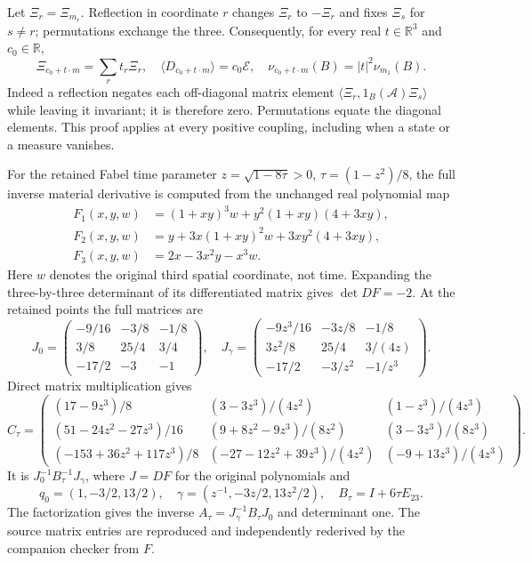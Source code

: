 Let $\Xi_r=\Xi_{m_r}$. Reflection in coordinate $r$ changes $\Xi_r$ to
$-\Xi_r$ and fixes $\Xi_s$ for $s\ne r$; permutations exchange the three.
Consequently, for every real $t\in\mathbb R^3$ and $c_0\in\mathbb R$,
\begin{equation}\label{eq:fabel-affine-raw}
 \Xi_{c_0+t\cdot m}=\sum_rt_r\Xi_r,\quad
 \langle D_{c_0+t\cdot m}\rangle=c_0\mathcal E,\quad
 \nu_{c_0+t\cdot m}(B)=|t|^2\nu_{m_1}(B).
\end{equation}
Indeed a reflection negates each off-diagonal matrix element
$\langle\Xi_r,1_B(\mathcal A)\Xi_s\rangle$ while leaving it invariant;
it is therefore zero. Permutations equate the diagonal elements.
This proof applies at every positive coupling, including when a state
or a measure vanishes.

For the retained Fabel time parameter $z=\sqrt{1-8\tau}>0$,
$\tau=(1-z^2)/8$, the full inverse material derivative is
computed from the unchanged real polynomial map
\begin{align*}
 F_1(x,y,w)&=(1+xy)^3w+y^2(1+xy)(4+3xy),\\
 F_2(x,y,w)&=y+3x(1+xy)^2w+3xy^2(4+3xy),\\
 F_3(x,y,w)&=2x-3x^2y-x^3w .
\end{align*}
Here $w$ denotes the original third spatial coordinate, not time.
Expanding the three-by-three determinant of its differentiated matrix
gives $\det DF=-2$. At the retained points the full matrices are
\[
 J_0=\begin{pmatrix}-9/16&-3/8&-1/8\\3/8&25/4&3/4\\-17/2&-3&-1\end{pmatrix},
 \quad
 J_\gamma=\begin{pmatrix}
 -9z^3/16&-3z/8&-1/8\\3z^2/8&25/4&3/(4z)\\-17/2&-3/z^2&-1/z^3
 \end{pmatrix}.
\]
Direct matrix multiplication gives
\begin{equation}\label{eq:fabel-C-full}
 C_\tau=
 \begin{pmatrix}
 (17-9z^3)/8&(3-3z^3)/(4z^2)&(1-z^3)/(4z^3)\\
 (51-24z^2-27z^3)/16&(9+8z^2-9z^3)/(8z^2)&(3-3z^3)/(8z^3)\\
 (-153+36z^2+117z^3)/8&(-27-12z^2+39z^3)/(4z^2)&(-9+13z^3)/(4z^3)
 \end{pmatrix}.
\end{equation}
It is $J_0^{-1}B_\tau^{-1}J_\gamma$, where $J=DF$ for the original
polynomials and
\[
q_0=(1,-3/2,13/2),\quad
\gamma=(z^{-1},-3z/2,13z^2/2),\quad B_\tau=I+6\tau E_{23}.
\]
The factorization gives the inverse $A_\tau=J_\gamma^{-1}B_\tau J_0$
and determinant one.
The source matrix entries are reproduced and independently rederived
by the companion checker from $F$.

